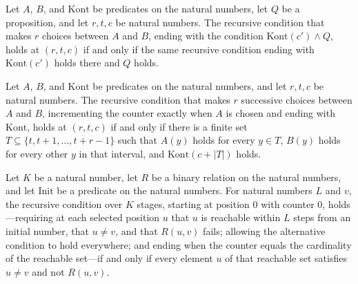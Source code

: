 \begin{lemma}
\label{Complexity.LogProg.ISCount.gs_and}
\leanok
{}
Let $A$, $B$, and $\text{Kont}$ be predicates on the natural numbers, let $Q$ be a
proposition, and let $r,t,c$ be natural numbers. The recursive condition that makes $r$
choices between $A$ and $B$, ending with the condition $\text{Kont}(c')\land Q$, holds at
$(r,t,c)$ if and only if the same recursive condition ending with $\text{Kont}(c')$ holds
there and $Q$ holds.
\end{lemma}

\begin{lemma}
\label{Complexity.LogProg.ISCount.gs_iff}
\leanok
{}
Let $A$, $B$, and $\text{Kont}$ be predicates on the natural numbers, and let $r,t,c$ be
natural numbers. The recursive condition that makes $r$ successive choices between $A$
and $B$, incrementing the counter exactly when $A$ is chosen and ending with
$\text{Kont}$, holds at $(r,t,c)$ if and only if there is a finite set
$T\subseteq\{t,t+1,\ldots,t+r-1\}$ such that $A(y)$ holds for every $y\in T$, $B(y)$
holds for every other $y$ in that interval, and $\text{Kont}(c+|T|)$ holds.
\end{lemma}

\begin{lemma}
\label{Complexity.LogProg.ISCount.gs_inner}
\leanok
{}
Let $K$ be a natural number, let $R$ be a binary relation on the natural numbers, and
let $\text{Init}$ be a predicate on the natural numbers. For natural numbers $L$ and $v$,
the recursive condition over $K$ stages, starting at position $0$ with counter $0$,
holds—requiring at each selected position $u$ that $u$ is reachable within $L$ steps
from an initial number, that $u\ne v$, and that $R(u,v)$ fails; allowing the alternative
condition to hold everywhere; and ending when the counter equals the cardinality of the
reachable set—if and only if every element $u$ of that reachable set satisfies $u\ne v$
and not $R(u,v)$.
\end{lemma}

